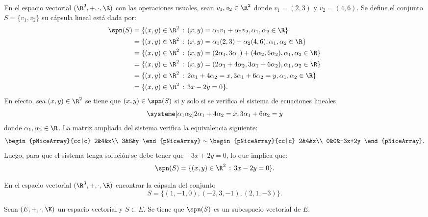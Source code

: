 \documentclass[compacto,10pt]{pubciencias-notas}
\begin{document}
\begin{ejem}\label{S07C01:EJ_Cap_lin}
En el espacio vectorial $(\R^{2}, +, \cdot, \R)$ con las operaciones usuales, sean $v_{1}, v_{2}\in \R^{2}$ donde $v_{1} = (2, 3)$ y $v_{2} = (4, 6)$. Se define el conjunto $S = \{v_{1}, v_{2}\}$ su cápsula lineal está dada por:
\begin{align*}
    \spn(S) &= \{(x, y)\in\R^{2}\,:\,(x, y) = \alpha_{1}v_{1}+\alpha_{2}v_{2},\alpha_{1}, \alpha_{2}\in\R\}\\
    &= \{(x, y)\in\R^{2}\,:\,(x, y) = \alpha_{1}(2, 3)+\alpha_{2}(4, 6),\alpha_{1}, \alpha_{2}\in\R\}\\
    &= \{(x, y)\in\R^{2}\,:\,(x, y) = (2\alpha_{1}, 3\alpha_{1})+(4\alpha_{2}, 6\alpha_{2}),\alpha_{1}, \alpha_{2}\in\R\}\\
    &= \{(x, y)\in\R^{2}\,:\,(x, y) = (2\alpha_{1}+4\alpha_{2}, 3\alpha_{1}+6\alpha_{2}),\alpha_{1}, \alpha_{2}\in\R\}\\
    &= \{(x, y)\in\R^{2}\,:\,2\alpha_{1}+4\alpha_{2} = x, 3\alpha_{1}+6\alpha_{2} = y,\alpha_{1}, \alpha_{2}\in\R\}\\
    &= \{(x, y)\in\R^{2}\,:\,3x - 2y = 0\}.
\end{align*}
En efecto, sea $(x, y)\in\R^{2}$ se tiene que $(x,y)\in\spn(S)$ si y solo si se verifica el sistema de ecuaciones lineales
\[
    \systeme[\alpha_{1}\alpha_{2}]{2\alpha_{1}+4\alpha_{2} = x, 3\alpha_{1}+6\alpha_{2} = y}
\]
donde $\alpha_{1}, \alpha_{2}\in\R$. La matriz ampliada del sistema verifica la equivalencia siguiente:
\[
    \begin{pNiceArray}{cc|c}
    2&4&x\\
    3&6&y
    \end{pNiceArray}
    \sim
    \begin{pNiceArray}{cc|c}
    2&4&x\\
    0&0&-3x+2y
    \end{pNiceArray}.
\]
Luego, para que el sistema tenga solución se debe tener que $-3x+2y=0$, lo que implica que:
\[
    \spn(S) = \{(x, y)\in\R^{2}\,:\,3x - 2y = 0\}.
\]
\end{ejem}

\begin{ejer}\hspace{0pt} En el espacio vectorial $(\R^{3},+,\cdot,\R)$ encontrar la cápsula del conjunto \[S=\{(1,-1,0),(-2,3,-1),(2,1,-3)\}.\]
\end{ejer}

\begin{teo}
Sean $(E,+,\cdot,\K)$ un espacio vectorial y $S\subset E$. Se tiene que $\spn(S)$ es un subespacio vectorial de $E$.
\end{teo}
\end{document}
